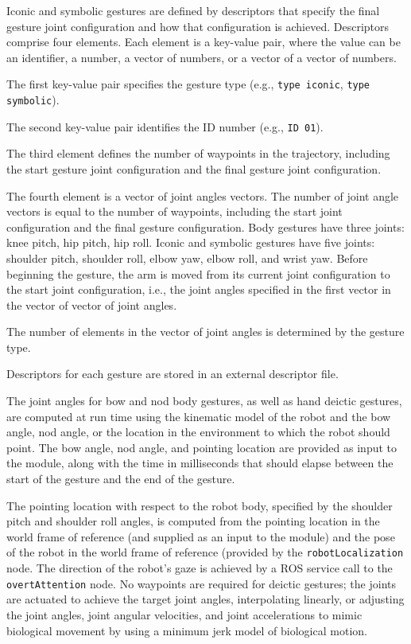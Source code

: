 \documentclass{CSSRforAfrica}
\begin{document}
Iconic and symbolic gestures are defined by descriptors that specify the final gesture joint configuration and how that configuration is achieved. Descriptors comprise four elements. Each element is a key-value pair, where the value can be an identifier, a number, a vector of numbers, or a vector of a vector of numbers.

The first key-value pair specifies the gesture type (e.g., \texttt{type iconic}, \texttt{type symbolic}).

The second key-value pair identifies the ID number (e.g., \texttt{ID 01}).

The third element defines the number of waypoints in the trajectory, including the start gesture joint configuration and the final gesture joint configuration.

The fourth element is a vector of joint angles vectors. The number of joint angle vectors is equal
to the number of waypoints, including the start joint configuration and the final gesture configuration. Body gestures have three joints: knee pitch, hip pitch, hip roll. Iconic and symbolic gestures have five joints: shoulder pitch, shoulder roll, elbow yaw, elbow roll, and wrist yaw. Before beginning the gesture, the arm is moved from its current joint configuration to the start joint configuration, i.e., the joint angles specified in the first vector in the vector of vector of joint angles.

The number of elements in the vector of joint angles is determined by the gesture type.

Descriptors for each gesture are stored in an external descriptor file.

The joint angles for bow and nod body gestures, as well as hand deictic gestures, are computed at run time using the kinematic model of the robot and the bow angle, nod angle, or the location in the environment to which the robot should point. The bow angle, nod angle, and pointing location are provided as input to the module, along with the time in milliseconds that should elapse between the start of the gesture and the end of the gesture.

The pointing location with respect to the robot body, specified by the shoulder pitch and shoulder roll angles, is computed from the pointing location in the world frame of reference (and supplied as an input to the module) and the pose of the robot in the world frame of reference (provided by the \texttt{robotLocalization} node.  The direction of the robot's gaze is achieved by a ROS service call to the \texttt{overtAttention} node. No waypoints are required for deictic gestures; the joints are actuated to achieve the target joint angles, interpolating linearly, or adjusting the joint angles, joint angular velocities, and joint accelerations to mimic biological movement by using a minimum jerk model of biological motion.
\end{document}
